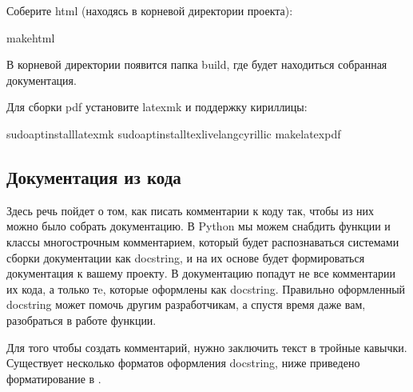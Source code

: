 \documentclass[letterpaper,10pt,russian]{sphinxmanual}
\begin{document}
\sphinxAtStartPar
Соберите html (находясь в корневой директории проекта):

\begin{sphinxVerbatim}[commandchars=\\\{\}]
makehtml
\end{sphinxVerbatim}

\sphinxAtStartPar
В корневой директории появится папка build, где будет находиться собранная документация.

\sphinxAtStartPar
Для сборки pdf установите latexmk и поддержку кириллицы:

\begin{sphinxVerbatim}[commandchars=\\\{\}]
sudoaptinstalllatexmk
sudoaptinstalltexlive\PYGZhy{}lang\PYGZhy{}cyrillic
makelatexpdf
\end{sphinxVerbatim}


\subsection{Документация из кода}
\label{\detokenize{educational_materials/docs/content:id11}}
\sphinxAtStartPar
Здесь речь пойдет о том, как писать комментарии к коду так, чтобы из них можно было собрать документацию. В Python мы можем снабдить функции и классы многострочным комментарием, который будет распознаваться системами сборки документации как docstring, и на их основе будет формироваться документация к вашему проекту. В документацию попадут не все комментарии их кода, а только тe, которые оформлены как docstring. Правильно оформленный docstring может помочь другим разработчикам, а спустя время даже вам, разобраться в работе функции.

\sphinxAtStartPar
Для того чтобы создать комментарий, нужно заключить текст в тройные кавычки. Существует несколько форматов оформления docstring, ниже приведено форматирование в .
\end{document}
